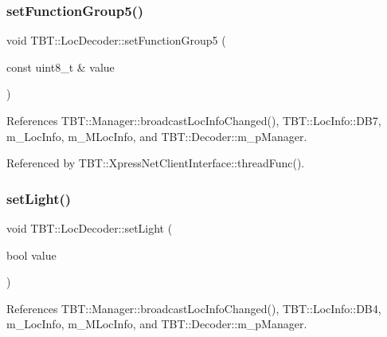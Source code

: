 \subsubsection{\texorpdfstring{set\+Function\+Group5()}{setFunctionGroup5()}}
{\footnotesize\ttfamily void T\+B\+T\+::\+Loc\+Decoder\+::set\+Function\+Group5 (\begin{DoxyParamCaption}\item[{const uint8\+\_\+t \&}]{value }\end{DoxyParamCaption})\hspace{0.3cm}{\ttfamily [inline]}}



References T\+B\+T\+::\+Manager\+::broadcast\+Loc\+Info\+Changed(), T\+B\+T\+::\+Loc\+Info\+::\+D\+B7, m\+\_\+\+Loc\+Info, m\+\_\+\+M\+Loc\+Info, and T\+B\+T\+::\+Decoder\+::m\+\_\+p\+Manager.



Referenced by T\+B\+T\+::\+Xpress\+Net\+Client\+Interface\+::thread\+Func().

\mbox{\label{classTBT_1_1LocDecoder_a71807a8bab2731cc511659f118ecb01a_a71807a8bab2731cc511659f118ecb01a}} 
\subsubsection{\texorpdfstring{set\+Light()}{setLight()}}
{\footnotesize\ttfamily void T\+B\+T\+::\+Loc\+Decoder\+::set\+Light (\begin{DoxyParamCaption}\item[{bool}]{value }\end{DoxyParamCaption})\hspace{0.3cm}{\ttfamily [inline]}}



References T\+B\+T\+::\+Manager\+::broadcast\+Loc\+Info\+Changed(), T\+B\+T\+::\+Loc\+Info\+::\+D\+B4, m\+\_\+\+Loc\+Info, m\+\_\+\+M\+Loc\+Info, and T\+B\+T\+::\+Decoder\+::m\+\_\+p\+Manager.

\mbox{\label{classTBT_1_1LocDecoder_a0ed2026cd64ba1e2aa411e1228027f4e_a0ed2026cd64ba1e2aa411e1228027f4e}} 
